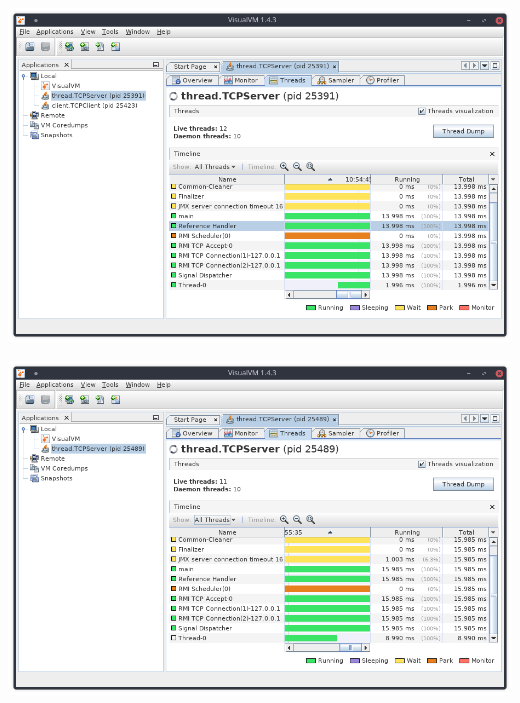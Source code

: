 \documentclass[a4paper, 12pt, answers]{exam}
\begin{document}
\begin{questions}
\begin{parts}
\begin{solution}
        \pagebreak
        \includegraphics[width = \linewidth]{visualvm-01.png}
        \label{fig:thread-1}
        \vspace{1em}
        
        \includegraphics[width = \linewidth]{visualvm-02.png}
        \label{fig:thread-2}
        \vspace{1em}
        

\end{solution}
\end{parts}
\end{questions}
\end{document}
